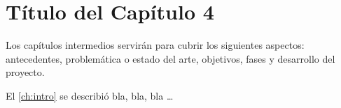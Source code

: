 \chapter{Título del Capítulo 4}
\label{ch:cuatro}

\noindent Los capítulos intermedios servirán para cubrir los siguientes aspectos: antecedentes, problemática o estado del arte, objetivos, fases y desarrollo del proyecto.

El \autoref{ch:intro} se describió bla, bla, bla …